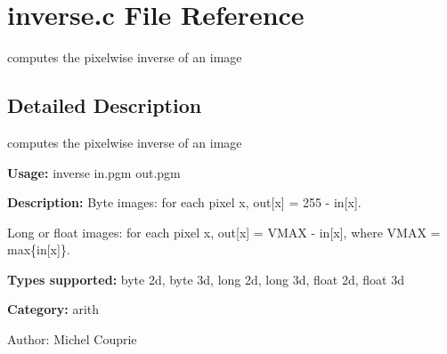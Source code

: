 \section{inverse.c File Reference}
\label{inverse_8c}
computes the pixelwise inverse of an image 



\subsection{Detailed Description}
computes the pixelwise inverse of an image 

{\bf Usage:} inverse in.pgm out.pgm

{\bf Description:} Byte images: for each pixel x, out[x] = 255 - in[x].\par
 Long or float images: for each pixel x, out[x] = VMAX - in[x], where VMAX = max\{in[x]\}.

{\bf Types supported:} byte 2d, byte 3d, long 2d, long 3d, float 2d, float 3d

{\bf Category:} arith

\begin{Desc}
\item[Author:]Michel Couprie \end{Desc}
